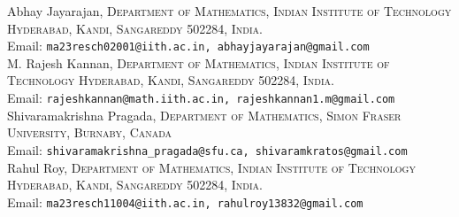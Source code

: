 \documentclass[11pt]{article}
\newcommand{\affl}[3]{%
	\noindent #1,
	\textsc{#3}\\
	Email: \texttt{#2}\\[1.5pt]
}
\numberwithin{equation}{section}
\theoremstyle{definition}
\theoremstyle{remark}
\begin{document}
	
	
	
	
	\affl{Abhay Jayarajan}{ma23resch02001@iith.ac.in, abhayjayarajan@gmail.com}{ Department of Mathematics, Indian Institute of Technology Hyderabad, Kandi, Sangareddy 502284, India.}
	
	\affl{M. Rajesh Kannan}{rajeshkannan@math.iith.ac.in, rajeshkannan1.m@gmail.com}{Department of Mathematics, Indian Institute of Technology Hyderabad, Kandi, Sangareddy 502284, India.}
	
	\affl{Shivaramakrishna Pragada}{shivaramakrishna\_pragada@sfu.ca, shivaramkratos@gmail.com}{Department of Mathematics, Simon Fraser University, Burnaby, Canada}
	
	\affl{Rahul Roy}{ma23resch11004@iith.ac.in, rahulroy13832@gmail.com}{ Department of Mathematics, Indian Institute of Technology Hyderabad, Kandi, Sangareddy 502284, India.}
\end{document}
